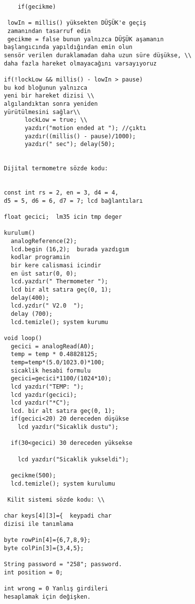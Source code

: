 \documentclass[conference]{IEEEtran}
\begin{document}
\begin{verbatim}
    if(gecikme)      
            
 lowIn = millis() yüksekten DÜŞÜK'e geçiş 
 zamanından tasarruf edin     
 gecikme = false bunun yalnızca DÜŞÜK aşamanın 
başlangıcında yapıldığından emin olun     
sensör verilen duraklamadan daha uzun süre düşükse, \\
daha fazla hareket olmayacağını varsayıyoruz   
    
if(!lockLow && millis() - lowIn > pause)          
bu kod bloğunun yalnızca 
yeni bir hareket dizisi \\
algılandıktan sonra yeniden
yürütülmesini sağlar\\
      lockLow = true; \\
      yazdır("motion ended at "); //çıktı        
      yazdır((millis() - pause)/1000);          
      yazdır(" sec"); delay(50);       
  

Dijital termometre sözde kodu:

     
const int rs = 2, en = 3, d4 = 4, 
d5 = 5, d6 = 6, d7 = 7; lcd bağlantıları

float gecici;  lm35 icin tmp deger

kurulum() 
  analogReference(2);
  lcd.begin (16,2);  burada yazdıgım 
  kodlar programıin 
  bir kere calismasi icindir
  en üst satır(0, 0);
  lcd.yazdır(" Thermometer ");      
  lcd bir alt satıra geç(0, 1);
  delay(400);
  lcd.yzdır(" V2.0  ");
  delay (700);
  lcd.temizle(); system kurumu

void loop() 
  gecici = analogRead(A0);                                                    
  temp = temp * 0.48828125;
  temp=temp*(5.0/1023.0)*100; 
  sicaklik hesabi formulu
  gecici=gecici*1100/(1024*10);
  lcd yazdır("TEMP: ");
  lcd yazdır(gecici);
  lcd yazdır("*C");
  lcd. bir alt satıra geç(0, 1);
  if(gecici<20) 20 dereceden düşükse
    lcd yazdır("Sicaklik dustu");
  
  if(30<gecici) 30 dereceden yüksekse
  
    lcd yazdır("Sicaklik yukseldi"); 
  
  gecikme(500);
  lcd.temizle(); system kurulumu
  
 Kilit sistemi sözde kodu: \\
 
char keys[4][3]={  keypadi char 
dizisi ile tanımlama

byte rowPin[4]={6,7,8,9};
byte colPin[3]={3,4,5};

String password = "258"; password.
int position = 0;

int wrong = 0 Yanlış girdileri 
hesaplamak için değişken.



\end{verbatim}
\end{document}
